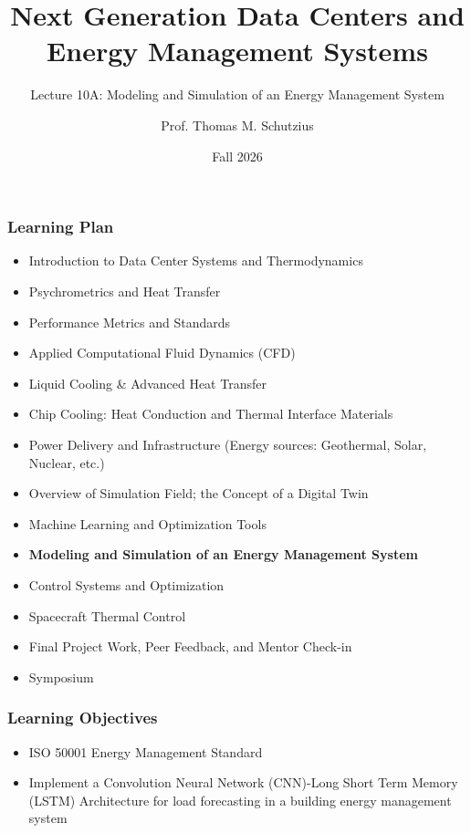 \documentclass[aspectratio=169,10pt,xcolor={table,dvipsnames},t]{beamer}
\title[lecture 10]{Next Generation Data Centers and Energy Management Systems}
\subtitle{Lecture 10A: Modeling and Simulation of an Energy Management System}
\author{Prof. Thomas M. Schutzius}
\institute{Department of Mechanical Engineering}
\date{Fall 2026}
\begin{document}
\begin{frame}
  \titlepage
\end{frame}


{
\smallframetitle %

\begin{frame}
	\frametitle{Learning Plan}
	\begin{itemize}
		\item Introduction to Data Center Systems and Thermodynamics 
		\item Psychrometrics and Heat Transfer
		\item Performance Metrics and Standards
		\item Applied Computational Fluid Dynamics (CFD)
		\item Liquid Cooling \& Advanced Heat Transfer
		\item Chip Cooling: Heat Conduction and Thermal Interface Materials
		\item Power Delivery and Infrastructure (Energy sources: Geothermal, Solar, Nuclear, etc.)
		\item Overview of Simulation Field; the Concept of a Digital Twin
		\item Machine Learning and Optimization Tools
		\item \textbf{Modeling and Simulation of an Energy Management System}
		\item Control Systems and Optimization 
		\item Spacecraft Thermal Control
		\item Final Project Work, Peer Feedback, and Mentor Check-in 
		\item Symposium 
	\end{itemize}		
\end{frame}

\begin{frame}
	\frametitle{Learning Objectives} 
		\begin{itemize}
			\item ISO 50001 Energy Management Standard
			\item Implement a Convolution Neural Network (CNN)-Long Short Term Memory (LSTM) Architecture for load forecasting in a building energy management system
		\end{itemize}		
\end{frame}


}
\end{document}

